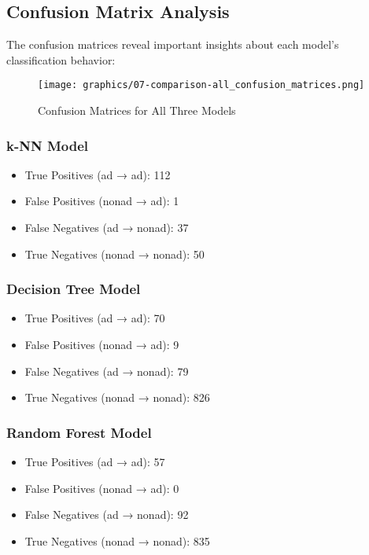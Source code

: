 \subsection{Confusion Matrix Analysis}

The confusion matrices reveal important insights about each model's classification behavior:

\begin{figure}[h]
\centering
\texttt{[image: graphics/07-comparison-all\_confusion\_matrices.png]}
\caption{Confusion Matrices for All Three Models}
\label{fig:confusion_matrices}
\end{figure}

\subsubsection{k-NN Model}
\begin{itemize}
    \item True Positives (ad → ad): 112
    \item False Positives (nonad → ad): 1
    \item False Negatives (ad → nonad): 37
    \item True Negatives (nonad → nonad): 50
\end{itemize}

\subsubsection{Decision Tree Model}
\begin{itemize}
    \item True Positives (ad → ad): 70
    \item False Positives (nonad → ad): 9
    \item False Negatives (ad → nonad): 79
    \item True Negatives (nonad → nonad): 826
\end{itemize}

\subsubsection{Random Forest Model}
\begin{itemize}
    \item True Positives (ad → ad): 57
    \item False Positives (nonad → ad): 0
    \item False Negatives (ad → nonad): 92
    \item True Negatives (nonad → nonad): 835
\end{itemize}

